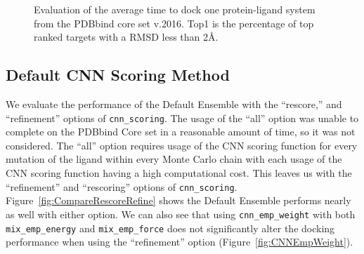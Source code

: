 \documentclass[linenumbers,doublespacing]{bmcart}
\begin{document}
\begin{figure}[tb]
        \caption{Evaluation of the average time to dock one protein-ligand system from the PDBbind core set v.2016. Top1 is the percentage of top ranked targets with a RMSD less than 2{\AA}.}
        \label{fig:OptimalRescore}
\end{figure}    

\subsection{Default CNN Scoring Method}
 We evaluate the performance of the Default Ensemble with the ``rescore,'' and ``refinement'' options of \texttt{cnn\_scoring}. The usage of the ``all'' option was unable to complete on the PDBbind Core set in a reasonable amount of time, so it was not considered. The ``all'' option requires usage of the CNN scoring function for every mutation of the ligand within every Monte Carlo chain with each usage of the CNN scoring function having a high computational cost. This leaves us with the ``refinement'' and ``rescoring'' options of \texttt{cnn\_scoring}. Figure~\ref{fig:CompareRescoreRefine} shows the Default Ensemble performs nearly as well with either option. We can also see that using \texttt{cnn\_emp\_weight} with both \texttt{mix\_emp\_energy} and \texttt{mix\_emp\_force} does not significantly alter the docking performance when using the ``refinement'' option (Figure~\ref{fig:CNNEmpWeight}).
\end{document}
